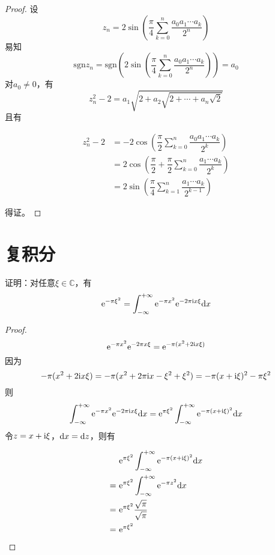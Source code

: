 \begin{proof}

    设
    \[z_n = 2 \sin{\left( \dfrac{\pi}{4} \sum\limits_{k = 0}^{n}{\dfrac{a_0 a_1 \cdots a_k}{2^n}} \right)}\]
    易知
    \[\mathrm{sgn}{z_n} = \mathrm{sgn}\left( 2 \sin{\left( \dfrac{\pi}{4} \sum\limits_{k = 0}^{n}{\dfrac{a_0 a_1 \cdots a_k}{2^n}} \right)} \right) = a_0\]
    对$a_0 \neq 0$，有
    \[z_n^2 - 2 = a_1\sqrt{2 + a_2\sqrt{2 + \cdots + a_n\sqrt{2}}}\]
    且有

    \begin{align*}
        z_n^2 - 2 & = -2 \cos{\left( \dfrac{\pi}{2}\sum\limits_{k = 0}^{n}{\dfrac{a_0 a_1 \cdots a_k}{2^k}} \right)} \\
        & = 2 \cos{\left( \dfrac{\pi}{2} + \dfrac{\pi}{2}\sum\limits_{k = 0}^{n}{\dfrac{a_1 \cdots a_k}{2^k}} \right)} \\
        & = 2 \sin{\left( \dfrac{\pi}{4}\sum\limits_{k = 1}^{n}{\dfrac{a_1 \cdots a_k}{2^{k - 1}}} \right)}
    \end{align*}

    得证。

\end{proof}

\section{复积分}

\begin{proposition}

    证明：对任意$ \xi \in \mathbb{C}$，有
    \[\mathrm{e}^{-\pi\xi^2} = \int_{-\infty}^{+\infty}{\mathrm{e}^{-\pi x^2}\mathrm{e}^{-2\pi \mathrm{i} x\xi}}\mathrm{d} x\]
    
\end{proposition}

\begin{proof}

    \[\mathrm{e}^{-\pi x^2}\mathrm{e}^{-2\pi x\xi} = \mathrm{e}^{-\pi(x^2 + 2\mathrm{i} x\xi)}\]
    因为
    \[-\pi(x^2 + 2\mathrm{i} x\xi) = -\pi (x^2 + 2\pi\mathrm{i} x - \xi^2 + \xi^2) = -\pi(x + \mathrm{i} \xi)^2 - \pi\xi^2\]
    则
    \[\int_{-\infty}^{+\infty}{\mathrm{e}^{-\pi x^2}\mathrm{e}^{-2\pi \mathrm{i} x\xi}}\mathrm{d} x = \mathrm{e}^{\pi\xi^2} \int_{-\infty}^{+\infty}{\mathrm{e}^{-\pi (x + \mathrm{i}\xi)^2}}\mathrm{d} x\]
    令$z = x + \mathrm{i}\xi$，$\mathrm{d} x = \mathrm{d} z$，则有

    \begin{align*}
        & \mathrm{e}^{\pi\xi^2} \int_{-\infty}^{+\infty}{\mathrm{e}^{-\pi (x + \mathrm{i}\xi)^2}}\mathrm{d} x \\
        = \ & \mathrm{e}^{\pi\xi^2} \int_{-\infty}^{+\infty}{\mathrm{e}^{-\pi z^2}}\mathrm{d} x \\
        = \ & \mathrm{e}^{\pi\xi^2} \dfrac{\sqrt{\pi}}{\sqrt{\pi}} \\
        = \ & \mathrm{e}^{\pi\xi^2}
    \end{align*}

\end{proof}

